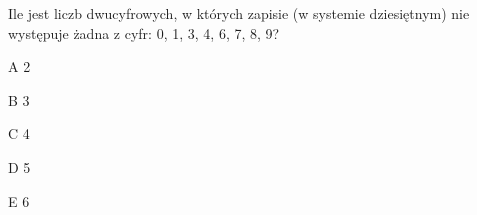 \begin{tresc}
Ile jest liczb dwucyfrowych, w których zapisie (w systemie dziesiętnym) nie występuje żadna z cyfr: 0, 1, 3, 4, 6, 7, 8, 9?
\end{tresc}
\begin{wariant}{A} 2 \end{wariant}
\begin{wariant}{B} 3 \end{wariant}
\begin{wariant}{C} 4 \end{wariant}
\begin{wariant}{D} 5 \end{wariant}
\begin{wariant}{E} 6 \end{wariant}
